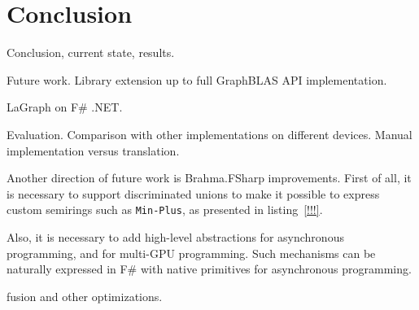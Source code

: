 \section{Conclusion}

Conclusion, current state, results.

Future work. Library extension up to full GraphBLAS API implementation.

LaGraph on F\# .NET.

Evaluation. Comparison with other implementations on different devices.
Manual implementation versus translation.  

Another direction of future work is Brahma.FSharp improvements. 
First of all, it is necessary to support discriminated unions to make it possible to express custom semirings such as \texttt{Min-Plus}, as presented in listing~\ref{!!!}. 

Also, it is necessary to add high-level abstractions for asynchronous programming, and for multi-GPU programming.
Such mechanisms can be naturally expressed in F\# with native primitives for asynchronous programming.

fusion and other optimizations.